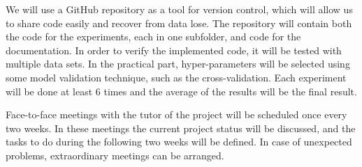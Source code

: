We will use a GitHub repository as a tool for version control, which will allow us to share code easily and recover from data lose. The repository will contain both the code for the experiments, each in one subfolder, and code for the documentation. In order to verify the implemented code, it will be tested with multiple data sets. In the practical part, hyper-parameters will be selected using some model validation technique, such as the cross-validation. Each ex\-per\-i\-ment will be done at least 6 times and the average of the results will be the final result. 

Face-to-face meetings with the tutor of the project will be scheduled once every two weeks. In these meetings the current project status will be discussed, and the tasks to do during the following two weeks will be defined. In case of unexpected problems, extraordinary meetings can be arranged.
